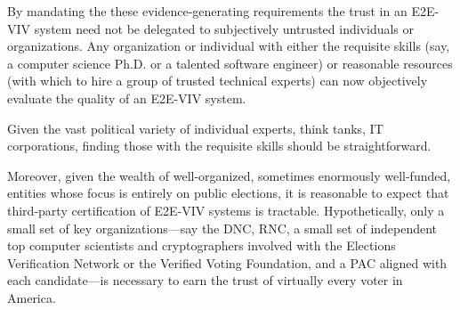 By mandating the these evidence-generating requirements the trust in
an E2E-VIV system need not be delegated to subjectively untrusted
individuals or organizations. Any organization or individual with
either the requisite skills (say, a computer science Ph.D. or a
talented software engineer) or reasonable resources (with which to
hire a group of trusted technical experts) can now objectively
evaluate the quality of an E2E-VIV system.  

Given the vast political variety of individual experts, think tanks,
IT corporations, finding those with the requisite skills should be
straightforward.  

Moreover, given the wealth of well-organized, sometimes enormously
well-funded, entities whose focus is entirely on public elections, it
is reasonable to expect that third-party certification of E2E-VIV
systems is tractable.  Hypothetically, only a small set of key
organizations---say the DNC, RNC, a small set of independent top
computer scientists and cryptographers involved with the Elections
Verification Network or the Verified Voting Foundation, and a PAC
aligned with each candidate---is necessary to earn the trust of
virtually every voter in America.

